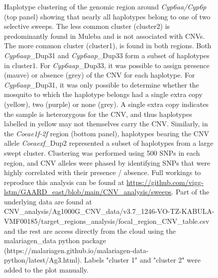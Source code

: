 \documentclass[a4paper,12pt]{article}
\begin{document}
\begin{figure}[h]
	\caption{\footnotesize Haplotype clustering of the genomic region around \textit{Cyp6aa/Cyp6p} (top panel) showing that nearly all haplotypes belong to one of two selective sweeps. The less common cluster (cluster2) is predominantly found in Muleba and is not associated with CNVs. The more common cluster (cluster1), is found in both regions. Both \textit{Cyp6aap}\_Dup31 and \textit{Cyp6aap}\_Dup33 form a subset of haplotypes in cluster1. For \textit{Cyp6aap}\_Dup33, it was possible to assign presence (mauve) or absence (grey) of the CNV for each haplotype. For \textit{Cyp6aap}\_Dup31, it was only possible to determine whether the mosquito to which the haplotype belongs had a single extra copy (yellow), two (purple) or none (grey). A single extra copy indicates the sample is heterozygous for the CNV, and thus haplotypes labelled in yellow may not themselves carry the CNV. Similarly, in the \textit{Coeae1f-2f} region (bottom panel), haplotypes bearing the CNV allele \textit{Coeaexf}\_Dup2 represented a subset of haplotypes from a large swept cluster. Clustering was performed using 500 SNPs in each region, and CNV alleles were phased by identifying SNPs that were highly correlated with their presence / absence. Full workings to reproduce this analysis can be found at \url{https://github.com/vigg-lstm/GAARD\_east/blob/main/CNV\_analysis/sweeps}. Part of the underlying data are found at CNV\_analysis/Ag1000G\_CNV\_data/v3.7\_1246-VO-TZ-KABULA-VMF00185/target\_regions\_analysis/focal\_region\_CNV\_table.csv and the rest are access directly from the cloud using the malariagen\_data python package (https://malariagen.github.io/malariagen-data-python/latest/Ag3.html). Labels "cluster 1" and "cluster 2" were added to the plot manually.}
	\label{FigS6}
\end{figure}



\clearpage
\end{document}
